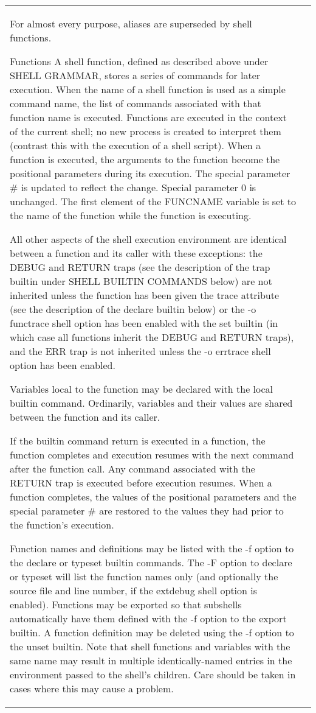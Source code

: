 \documentclass[11pt]{article}
\begin{document}
\begin{longtable}{p{}p{}}
{{{For almost every purpose, aliases are superseded by shell functions.

Functions
A shell function, defined as described above under SHELL GRAMMAR, stores a series of commands for later execution. When the name of a shell function is used as a simple command name, the list of commands associated with that function name is executed. Functions are executed in the context of the current shell; no new process is created to interpret them (contrast this with the execution of a shell script). When a function is executed, the arguments to the function become the positional parameters during its execution. The special parameter # is updated to reflect the change. Special parameter 0 is unchanged. The first element of the FUNCNAME variable is set to the name of the function while the function is executing.

All other aspects of the shell execution environment are identical between a function and its caller with these exceptions: the DEBUG and RETURN traps (see the description of the trap builtin under SHELL BUILTIN COMMANDS below) are not inherited unless the function has been given the trace attribute (see the description of the declare builtin below) or the -o functrace shell option has been enabled with the set builtin (in which case all functions inherit the DEBUG and RETURN traps), and the ERR trap is not inherited unless the -o errtrace shell option has been enabled.

Variables local to the function may be declared with the local builtin command. Ordinarily, variables and their values are shared between the function and its caller.

If the builtin command return is executed in a function, the function completes and execution resumes with the next command after the function call. Any command associated with the RETURN trap is executed before execution resumes. When a function completes, the values of the positional parameters and the special parameter # are restored to the values they had prior to the function's execution.

Function names and definitions may be listed with the -f option to the declare or typeset builtin commands. The -F option to declare or typeset will list the function names only (and optionally the source file and line number, if the extdebug shell option is enabled). Functions may be exported so that subshells automatically have them defined with the -f option to the export builtin. A function definition may be deleted using the -f option to the unset builtin. Note that shell functions and variables with the same name may result in multiple identically-named entries in the environment passed to the shell's children. Care should be taken in cases where this may cause a problem.

}}}
\end{longtable}
\end{document}
